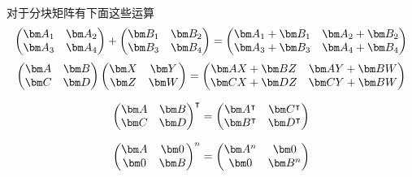 对于分块矩阵有下面这些运算
\begin{equation}
    \begin{pmatrix}
        \mat{A}_1 & \mat{A}_2 \\
        \mat{A}_3 & \mat{A}_4
    \end{pmatrix}
    +
    \begin{pmatrix}
        \mat{B}_1 & \mat{B}_2 \\
        \mat{B}_3 & \mat{B}_4
    \end{pmatrix}
    =
    \begin{pmatrix}
        \mat{A}_1+\mat{B}_1 & \mat{A}_2+\mat{B}_2 \\
        \mat{A}_3+\mat{B}_3 & \mat{A}_4+\mat{B}_4
    \end{pmatrix}
\end{equation}
\begin{equation}
    \begin{pmatrix}
        \mat{A} & \mat{B} \\
        \mat{C} & \mat{D}
    \end{pmatrix}
    \begin{pmatrix}
        \mat{X} & \mat{Y} \\
        \mat{Z} & \mat{W}
    \end{pmatrix}
    =
    \begin{pmatrix}
        \mat{AX}+\mat{BZ} & \mat{AY}+\mat{BW} \\
        \mat{CX}+\mat{DZ} & \mat{CY}+\mat{BW}
    \end{pmatrix}
\end{equation}

\begin{equation}
    \begin{pmatrix}
        \mat{A} & \mat{B} \\
        \mat{C} & \mat{D}
    \end{pmatrix}^\intercal
    =
    \begin{pmatrix}
        \mat{A}^\intercal & \mat{C}^\intercal \\
        \mat{B}^\intercal & \mat{D}^\intercal
    \end{pmatrix}
\end{equation}

\begin{equation}
    \begin{pmatrix}
        \mat{A} & \mat{0} \\
        \mat{0} & \mat{B}
    \end{pmatrix}^n
    =
    \begin{pmatrix}
        \mat{A}^n & \mat{0}   \\
        \mat{0}   & \mat{B}^n
    \end{pmatrix}
\end{equation}

